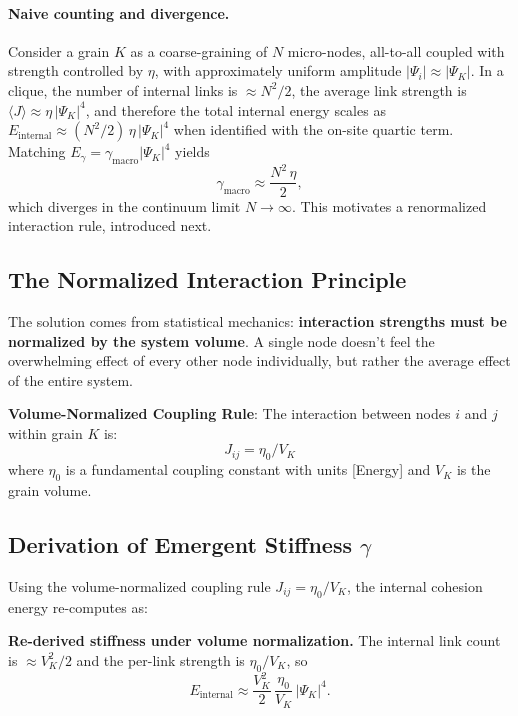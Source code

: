 \documentclass[11pt]{article}
\begin{document}
\paragraph{Naive counting and divergence.} Consider a grain $K$ as a coarse-graining of $N$ micro-nodes, all-to-all coupled with strength controlled by $\eta$, with approximately uniform amplitude $|\Psi_i|\approx |\Psi_K|$. In a clique, the number of internal links is $\approx N^2/2$, the average link strength is $\langle J\rangle \approx \eta\,|\Psi_K|^4$, and therefore the total internal energy scales as $E_{\text{internal}} \approx (N^2/2)\,\eta\,|\Psi_K|^4$ when identified with the on-site quartic term.
Matching $E_{\gamma} = \gamma_{\text{macro}} |\Psi_K|^4$ yields
\begin{equation}
  \gamma_{\text{macro}} \approx \frac{N^2\,\eta}{2},
\end{equation}
which diverges in the continuum limit $N\to\infty$. This motivates a renormalized interaction rule, introduced next.

\subsection{The Normalized Interaction Principle}

The solution comes from statistical mechanics: \textbf{interaction strengths must be normalized by the system volume}. A single node doesn't feel the overwhelming effect of every other node individually, but rather the average effect of the entire system.

\textbf{Volume-Normalized Coupling Rule}: The interaction between nodes $i$ and $j$ within grain $K$ is:
\begin{equation}
J_{ij} = \eta_0/V_K
\end{equation}
where $\eta_0$ is a fundamental coupling constant with units [Energy] and $V_K$ is the grain volume.

\subsection{Derivation of Emergent Stiffness $\gamma$}

Using the volume-normalized coupling rule $J_{ij}=\eta_0/V_K$, the internal cohesion energy re-computes as:

\textbf{Re-derived stiffness under volume normalization.} The internal link count is $\approx V_K^2/2$ and the per-link strength is $\eta_0/V_K$, so
\begin{equation}
E_{\text{internal}} \approx \frac{V_K^2}{2}\,\frac{\eta_0}{V_K}\,|\Psi_K|^4.
\end{equation}
\end{document}
